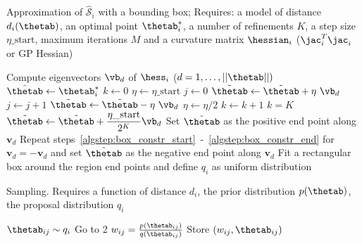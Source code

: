 \begin{algorithm}[!ht]
	\caption{Approximation of \(\mathcal{\hat{S}}_i\) with a bounding box; 
  Requires: a model of distance \(d_i(\thetab)\), 
  an optimal point \(\thetab_i^*\), 
  a number of refinements \(K\), 
  a step size \(\eta\_\text{start}\), 
  maximum iterations \(M\) and 
  a curvature matrix \(\hessian_i\) (\(\jac_i^T\jac_i \) or GP Hessian)}\label{alg:region_construction}
	\begin{algorithmic}[1]
	\State Compute eigenvectors \(\vb_{d}\) of \(\hess_i\) {\scriptsize (\(d = 1,\ldots,||\thetab ||)\)}
		\State \(\Tilde{\thetab} \gets \thetab_i^*\) \label{algstep:box_constr_start}
		\State \(k \gets 0\)
		\State \(\eta \gets \eta\_\text{start}\) 
		\Repeat
          \State \(j \gets 0\)
        	\Repeat
            \State \(\Tilde{\thetab} \gets \Tilde{\thetab} + \eta \ \vb_{d}\) 
            \State \(j \gets j + 1\)
        	 
        	\State \(\Tilde{\thetab} \gets \Tilde{\thetab} - \eta \ \vb_{d}\)
        	\State \(\eta \gets \eta/2\) 
        	\State \(k \gets k + 1\)
      \Until \(k = K\)
       
        \State \(\Tilde{\thetab} \gets \Tilde{\thetab} + \dfrac{\eta\_{\text{start}}}{2^K} \vb_d\) 
      \EndIf \label{algstep:box_constr_end}
    	\State Set \(\Tilde{\thetab}\) as the positive end point along \(\mathbf{v}_{d}\)
    	\State Repeat steps~\ref{algstep:box_constr_start}~-~\ref{algstep:box_constr_end} for \(\mathbf{v}_{d} = - \mathbf{v}_{d}\) and set \(\Tilde{\thetab}\) as the negative end point along \(\mathbf{v}_{d}\)
	\EndFor
	\State Fit a rectangular box around the region end points and define \(q_i\) as uniform distribution
	\end{algorithmic}
\end{algorithm}



\begin{algorithm}[H]
    \centering
    \caption{Sampling. Requires a function of distance \(d_i\), the prior distribution \(p(\thetab)\), the proposal distribution \(q_i\)}\label{alg:sampling_GB}
    \begin{algorithmic}[1]
      \State \(\thetab_{ij} \sim q_i\)
            \State Go to 2 
          \Else {}
            \State \(w_{ij} = \frac{p(\thetab_{ij})}{q(\thetab_{ij})}\) 
            \State Store \((w_{ij}, \thetab_{ij})\) 
          \EndIf
    \end{algorithmic}
\end{algorithm}
